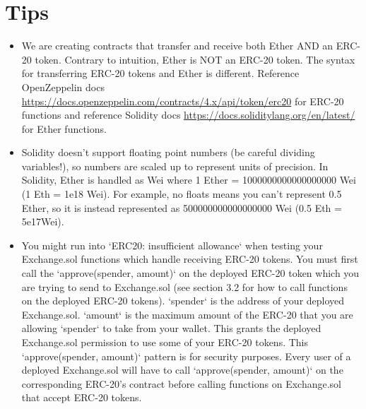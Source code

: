 \documentclass[10pt]{article}
\begin{document}
\section{Tips}
\begin{itemize}
    \item We are creating contracts that transfer and receive both Ether AND an ERC-20 token.  Contrary to intuition, Ether is NOT an ERC-20 token.  The syntax for transferring ERC-20 tokens and Ether is different.  Reference OpenZeppelin docs \url{https://docs.openzeppelin.com/contracts/4.x/api/token/erc20} for ERC-20 functions and reference Solidity docs \url{https://docs.soliditylang.org/en/latest/} for Ether functions.
    \item Solidity doesn’t support floating point numbers (be careful dividing variables!), so numbers are scaled up to represent units of precision.  In Solidity, Ether is handled as Wei where 1 Ether = 1000000000000000000 Wei (1 Eth = 1e18 Wei). For example, no floats means you can’t represent 0.5 Ether, so it is instead represented as 500000000000000000 Wei (0.5 Eth = 5e17Wei).
    \item You might run into `ERC20: insufficient allowance` when testing your Exchange.sol functions which handle receiving ERC-20 tokens.  You must first call the `approve(spender, amount)` on the deployed ERC-20 token which you are trying to send to Exchange.sol (see section 3.2 for how to call functions on the deployed ERC-20 tokens).  `spender` is the address of your deployed Exchange.sol.  `amount` is the maximum amount of the ERC-20 that you are allowing `spender` to take from your wallet.  This grants the deployed Exchange.sol permission to use some of your ERC-20 tokens.  This `approve(spender, amount)` pattern is for security purposes.  Every user of a deployed Exchange.sol will have to call `approve(spender, amount)` on the corresponding ERC-20’s contract before calling functions on Exchange.sol that accept ERC-20 tokens. 
\end{itemize}
\end{document}
